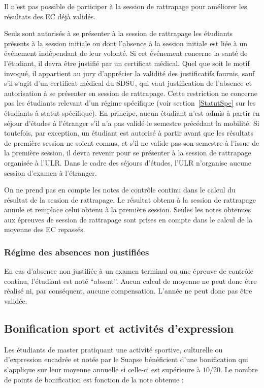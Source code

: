 \documentclass[a4paper,11pt]{article}
\begin{document}
Il n'est pas possible de participer à la session de rattrapage pour améliorer les résultats des EC déjà validés.

Seuls sont autorisés à se présenter à la session de rattrapage les étudiants présents à la session initiale ou dont l'absence à la session initiale est liée à un événement indépendant de leur volonté. Si cet événement concerne la santé de l'étudiant, il devra être justifié par un certificat médical. Quel que soit le motif invoqué, il appartient au jury d'apprécier la validité des justificatifs fournis, sauf s'il s'agit d'un certificat médical du SDSU, qui vaut justification de l'absence et autorisation à se présenter en session de rattrapage.
Cette restriction ne concerne pas les étudiants relevant d'un régime spécifique (voir section~\ref{StatutSpe} sur les étudiants à statut spécifique).
En principe, aucun étudiant n'est admis à partir en séjour d'études à l'étranger s'il n'a pas validé le semestre précédant la mobilité. Si toutefois, par exception, un étudiant est autorisé à partir avant que les résultats de première session ne soient connus, et s'il ne valide pas son semestre à l'issue de la première session, il devra revenir pour se présenter à la session de rattrapage organisée à l'ULR. Dans le cadre des séjours d'études, l'ULR n'organise aucune session d'examen à l'étranger.

On ne prend pas en compte les notes de contrôle continu dans le calcul du résultat de la session de rattrapage. Le résultat obtenu à la session de rattrapage annule et remplace celui obtenu à la première session. Seules les notes obtenues aux épreuves de session de rattrapage sont prises en compte dans le calcul de la moyenne des EC repassés.

\subsubsection{Régime des absences non justifiées}
En cas d'absence non justifiée à un examen terminal ou une épreuve de contrôle continu, l'étudiant est noté ``absent''. Aucun calcul de moyenne ne peut donc être réalisé ni, par conséquent, aucune compensation. L'année ne peut donc pas être validée.

\subsection{Bonification sport et activités d'expression}

Les étudiants de master pratiquant une activité sportive, culturelle ou d'expression encadrée et notée par le Suapse bénéficient d'une bonification qui s'applique sur leur moyenne annuelle si celle-ci est supérieure à $10/20$. Le nombre de points de bonification est fonction de la note obtenue :
\end{document}
